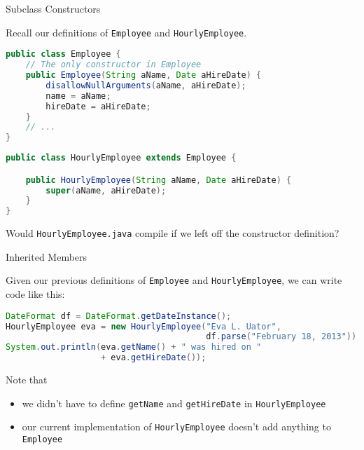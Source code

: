 \documentclass{beamer}
\begin{document}
\begin{frame}[fragile]{Subclass Constructors}


Recall our definitions of {\tt Employee} and {\tt HourlyEmployee}.
\begin{lstlisting}[language=Java]
public class Employee {
    // The only constructor in Employee
    public Employee(String aName, Date aHireDate) {
        disallowNullArguments(aName, aHireDate);
        name = aName;
        hireDate = aHireDate;
    }
    // ...
}
\end{lstlisting}

\begin{lstlisting}[language=Java]
public class HourlyEmployee extends Employee {

    public HourlyEmployee(String aName, Date aHireDate) {
        super(aName, aHireDate);
    }
}
\end{lstlisting}

Would {\tt HourlyEmployee.java} compile if we left off the constructor definition?

\end{frame}


\begin{frame}[fragile]{Inherited Members}


Given our previous definitions of {\tt Employee} and {\tt HourlyEmployee}, we can write code like this:
\begin{lstlisting}[language=Java]
DateFormat df = DateFormat.getDateInstance();
HourlyEmployee eva = new HourlyEmployee("Eva L. Uator",
                                        df.parse("February 18, 2013"));
System.out.println(eva.getName() + " was hired on " 
                   + eva.getHireDate());
\end{lstlisting}
Note that
\begin{itemize}
\item we didn't have to define {\tt getName} and {\tt getHireDate} in {\tt HourlyEmployee}
\item our current implementation of {\tt HourlyEmployee} doesn't add anything to {\tt Employee}
\end{itemize}


\end{frame}
\end{document}
